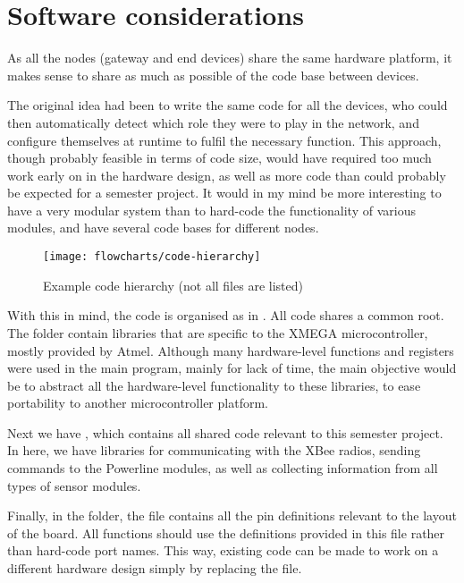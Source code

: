\pagebreak
\section{Software considerations}

As all the nodes (gateway and end devices) share the same hardware platform, it
makes sense to share as much as possible of the code base between devices.

The original idea had been to write the same code for all the devices, who could
then automatically detect which role they were to play in the network, and
configure themselves at runtime to fulfil the necessary function. This approach,
though probably feasible in terms of code size, would have required too much
work early on in the hardware design, as well as more code than could probably
be expected for a semester project. It would in my mind be more interesting to
have a very modular system than to hard-code the functionality of various
modules, and have several code bases for different nodes.

\begin{figure}[h]
  \begin{center}
    \texttt{[image: flowcharts/code-hierarchy]}
  \end{center}
  \caption{Example code hierarchy (not all files are listed)}
  \label{fig:code-hierarchy}
\end{figure}

With this in mind, the code is organised as in .
All code shares a common root. The folder  contain libraries
that are specific to the XMEGA microcontroller, mostly provided by Atmel.
Although many hardware-level functions and registers were used in the main
program, mainly for lack of time, the main objective would be to abstract all
the hardware-level functionality to these libraries, to ease portability to
another microcontroller platform.

Next we have , which contains all shared code relevant to
this semester project. In here, we have libraries for communicating with the
XBee radios, sending commands to the Powerline modules, as well as collecting
information from all types of sensor modules.

Finally, in the  folder, the  file contains
all the pin definitions relevant to the layout of the board. All functions
should use the definitions provided in this file rather than hard-code port
names. This way, existing code can be made to work on a different hardware
design simply by replacing the  file.

